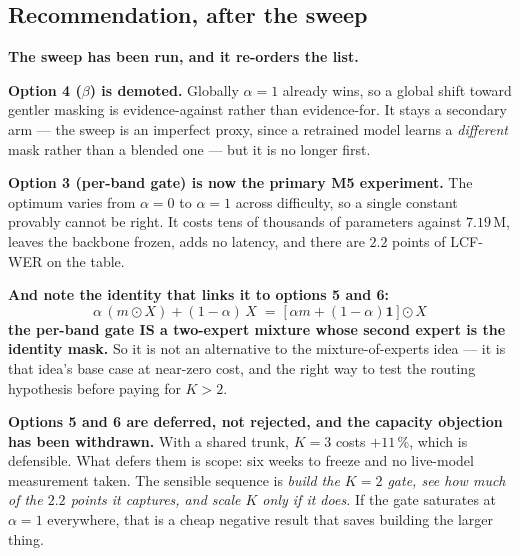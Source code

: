 \documentclass[11pt,a4paper]{article}
\begin{document}
\subsection*{Recommendation, after the sweep}

\textbf{The sweep has been run, and it re-orders the list.}

\textbf{Option 4 ($\beta$) is demoted.} Globally $\alpha=1$ already wins, so a
global shift toward gentler masking is evidence-against rather than
evidence-for. It stays a secondary arm --- the sweep is an imperfect proxy, since
a retrained model learns a \emph{different} mask rather than a blended one --- but
it is no longer first.

\textbf{Option 3 (per-band gate) is now the primary M5 experiment.} The optimum
varies from $\alpha=0$ to $\alpha=1$ across difficulty, so a single constant
provably cannot be right. It costs tens of thousands of parameters against
$7.19$\,M, leaves the backbone frozen, adds no latency, and there are $2.2$
points of LCF-WER on the table.

\textbf{And note the identity that links it to options 5 and 6:}
\[
\alpha\,(m \odot X) + (1-\alpha)\,X
   \;=\; \big[\,\alpha m + (1-\alpha)\mathbf{1}\,\big] \odot X
\]
\textbf{the per-band gate IS a two-expert mixture whose second expert is the
identity mask.} So it is not an alternative to the mixture-of-experts idea --- it
is that idea's base case at near-zero cost, and the right way to test the routing
hypothesis before paying for $K>2$.

\textbf{Options 5 and 6 are deferred, not rejected, and the capacity objection
has been withdrawn.} With a shared trunk, $K{=}3$ costs $+11\,\%$, which is
defensible. What defers them is scope: six weeks to freeze and no live-model
measurement taken. The sensible sequence is \emph{build the $K{=}2$ gate, see how
much of the $2.2$ points it captures, and scale $K$ only if it does.} If the
gate saturates at $\alpha=1$ everywhere, that is a cheap negative result that
saves building the larger thing.
\end{document}

